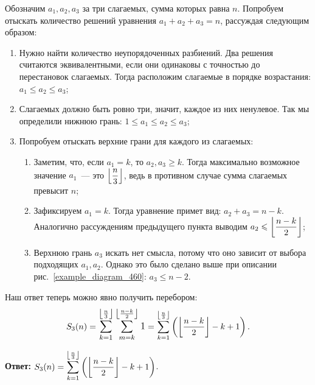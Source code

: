 \begin{solution}
Обозначим \(a_1, a_2, a_3\) за три слагаемых, сумма которых равна \(n\). Попробуем отыскать количество решений уравнения \(a_1 + a_2 + a_3 = n\), рассуждая следующим образом:
\begin{enumerate}
    \item Нужно найти количество неупорядоченных разбиений. Два решения считаются эквивалентными, если они одинаковы с точностью до перестановок слагаемых. Тогда расположим слагаемые в порядке возрастания: \(a_1 \leqslant a_2 \leqslant a_3\);
    
    \item Слагаемых должно быть ровно три, значит, каждое из них ненулевое. Так мы определили нижнюю грань: \(1 \leqslant a_1 \leqslant a_2 \leqslant a_3\);
    
    \item Попробуем отыскать верхние грани для каждого из слагаемых:
    \begin{enumerate}
        \item Заметим, что, если \(a_1 = k\), то \(a_2, a_3 \geqslant k\). Тогда максимально возможное значение \(a_1\)~--- это \(\displaystyle \left\lfloor{\frac{n}{3}}\right\rfloor\), ведь в противном случае сумма слагаемых превысит \(n\);
        
        \item Зафиксируем \(a_1 = k\). Тогда уравнение примет вид: \(a_2 + a_3 = n - k\). Аналогично рассуждениям предыдущего пункта выводим \(\displaystyle a_2 \leqslant \left\lfloor{\frac{n - k}{2}}\right\rfloor\);
        
        \item Верхнюю грань \(a_3\) искать нет смысла, потому что оно зависит от выбора подходящих \(a_1, a_2\). Однако это было сделано выше при описании рис.~\ref{example_diagram_460}: \(a_3 \leqslant n - 2\).
    \end{enumerate}
\end{enumerate}

Наш ответ теперь можно явно получить перебором:
\begin{equation*}
    S_{3}(n) = \mathlarger{\sum_{k = 1}^{\floor{\frac{n}{3}}} \sum_{m = k}^{\floor{\frac{n - k}{2}}} 1} =
    \sum_{k = 1}^{\floor{\frac{n}{3}}} \left( \floor{\frac{n - k}{2}} - k + 1 \right).
\end{equation*}

\textbf{Ответ:} \(\displaystyle S_{3}(n) = \sum_{k = 1}^{\left\lfloor{\frac{n}{3}}\right\rfloor} \left( \left\lfloor{\frac{n - k}{2}}\right\rfloor - k + 1 \right)\).

\end{solution}
